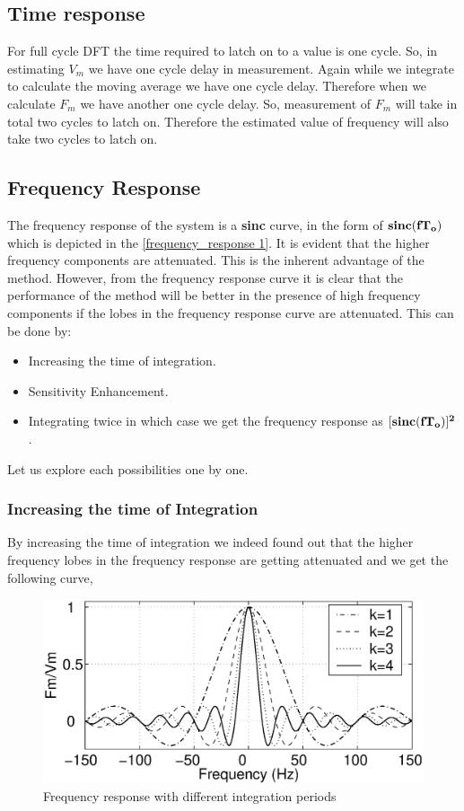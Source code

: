 \subsection{Time response}
For full cycle DFT the time required to latch on to a value is one cycle. So, in estimating $V_m$ we have one cycle delay in measurement. Again while we integrate to calculate the moving average we have one cycle delay. Therefore when we calculate $F_m$ we have another one cycle delay. So, measurement of $F_m$ will take in total two cycles to latch on. Therefore the estimated value of frequency will also take two cycles to latch on.

\subsection{Frequency Response} The frequency response of the system is a {\bf sinc} curve, in the form of ${\bf sinc(fT_o)}$ which is depicted in the \figurename\ref{frequency_response 1}. It is evident that the higher frequency components are attenuated. This is the inherent advantage of the method. However, from the frequency response curve it is clear that the performance of the method will be better in the presence of high frequency components if the lobes in the frequency response curve are attenuated. This can be done by:
\begin{itemize}
\item Increasing the time of integration.
\item Sensitivity Enhancement.
\item Integrating twice in which case we get the frequency response as ${\bf [sinc(fT_o)]^2}$.
\end{itemize}
Let us explore each possibilities one by one.
\subsubsection{Increasing the time of Integration}
By increasing the time of integration we indeed found out that the higher frequency lobes in the frequency response are  getting attenuated and we get the following curve,
\begin{figure}[!t]
\centering
\includegraphics[scale=0.3]{diffksinc.eps}
\caption{Frequency response with different integration periods}
\label{frequency_response_vark}
\end{figure}

